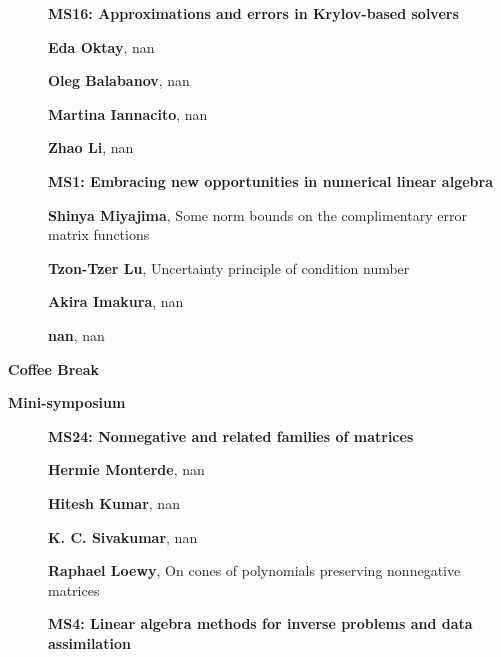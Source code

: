 \documentclass[ILAS2025-program.tex]{subfiles}
\begin{document}
\begin{description}
\begin{description}
    \item[] {\color{mstitle}\textbf{MS16: Approximations and errors in Krylov-based solvers}} 
    \item[] \textbf{Eda Oktay}, nan
        \item[] \textbf{Oleg Balabanov}, nan
        \item[] \textbf{Martina Iannacito}, nan
        \item[] \textbf{Zhao Li}, nan
        \end{description}
    \begin{description}
    \item[] {\color{mstitle}\textbf{MS1: Embracing new opportunities in numerical linear algebra}} 
    \item[] \textbf{Shinya Miyajima}, Some norm bounds on the complimentary error matrix functions
        \item[] \textbf{Tzon-Tzer Lu}, Uncertainty principle of condition number
        \item[] \textbf{Akira Imakura}, nan
        \item[] \textbf{nan}, nan
        \end{description}
    \item[\info{15:30\textrm{--}16:00}] \textbf{Coffee Break} 
    \item[\info{16:00\textrm{--}18:00}] \textbf{Mini-symposium} 
    \begin{description}
    \item[] {\color{mstitle}\textbf{MS24: Nonnegative and related families of matrices}} 
    \item[] \textbf{Hermie Monterde}, nan
        \item[] \textbf{Hitesh Kumar}, nan
        \item[] \textbf{K. C. Sivakumar}, nan
        \item[] \textbf{Raphael Loewy}, On cones of polynomials preserving nonnegative matrices
        \end{description}
    \begin{description}
    \item[] {\color{mstitle}\textbf{MS4: Linear algebra methods for inverse problems and data assimilation}} 

\end{description}
\end{description}
\end{document}

